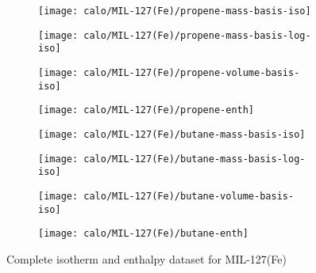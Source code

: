 \begin{figure}[H]
    \begin{subfigure}{0.25\textwidth}
        \texttt{[image: calo/MIL-127(Fe)/propene-mass-basis-iso]}%
        \label{appx:fig:shaping:mil127c3h6mass}
    \end{subfigure}%
    \begin{subfigure}{0.25\textwidth}
        \texttt{[image: calo/MIL-127(Fe)/propene-mass-basis-log-iso]}%
        \label{appx:fig:shaping:mil127c3h6masslog}
    \end{subfigure}%
    \begin{subfigure}{0.25\textwidth}
        \texttt{[image: calo/MIL-127(Fe)/propene-volume-basis-iso]}%
        \label{appx:fig:shaping:mil127c3h6volume}
    \end{subfigure}%
    \begin{subfigure}{0.25\textwidth}
        \texttt{[image: calo/MIL-127(Fe)/propene-enth]}%
        \label{appx:fig:shaping:mil127c3h6enth}
    \end{subfigure}%

    \begin{subfigure}{0.25\textwidth}
        \texttt{[image: calo/MIL-127(Fe)/butane-mass-basis-iso]}%
        \label{appx:fig:shaping:mil127c4h10mass}
    \end{subfigure}%
    \begin{subfigure}{0.25\textwidth}
        \texttt{[image: calo/MIL-127(Fe)/butane-mass-basis-log-iso]}%
        \label{appx:fig:shaping:mil127c4h10masslog}
    \end{subfigure}%
    \begin{subfigure}{0.25\textwidth}
        \texttt{[image: calo/MIL-127(Fe)/butane-volume-basis-iso]}%
        \label{appx:fig:shaping:mil127c4h10volume}
    \end{subfigure}%
    \begin{subfigure}{0.25\textwidth}
        \texttt{[image: calo/MIL-127(Fe)/butane-enth]}%
        \label{appx:fig:shaping:mil127c4h10enth}
    \end{subfigure}%

    \caption{Complete isotherm and enthalpy dataset for MIL-127(Fe)}%
    \label{appx:fig:shaping:calomil127}
\end{figure}
